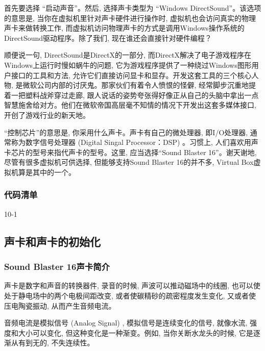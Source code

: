 \documentclass[12pt]{article}
\begin{document}
\begin{CJK}{UTF8}{gbsn}
首先要选择 ``启动声音''。然后, 选择声卡类型为 ``Windows DirectSound''。该选项的意思是, 当你在虚拟机里针对声卡硬件进行操作时, 虚拟机也会访问真实的物理声卡来做转换工作, 而虚拟机访问物理声卡的方式是调用Windows操作系统的DirectSound驱动程序。除了我们, 现在谁还会直接针对硬件编程？

顺便说一句, DirectSound是DirectX的一部分, 而DirectX解决了电子游戏程序在Windows上运行时慢如蜗牛的问题, 它为游戏程序提供了一种绕过Windows图形用户接口的工具和方法, 允许它们直接访问显卡和显存。开发这套工具的三个核心人物, 是微软公司内部的讨厌鬼。那家伙们有着令人愤恨的怪僻, 经常脚步沉重地提着一把塑料战斧穿过走廊, 跟人说话的姿势夸张得好像正从自己的头脑中拿出一点智慧施舍给对方。他们在微软帝国高层毫不知情的情况下开发出这套多媒体接口, 开创了游戏行业的新天地。

“控制芯片”的意思是, 你采用什么声卡。声卡有自己的微处理器, 即I/O处理器, 通常称为数字信号处理器 (Digital Singal Processor：DSP) 。习惯上, 人们喜欢用声卡芯片的型号来指代声卡的型号。这里, 应当选择“Sound Blaster 16”。谢天谢地, 尽管有很多虚拟机可供选择, 但能够支持Sound Blaster 16的并不多, Virtual Box虚拟机算是其中的一个。

\subsubsection{代码清单}
%
%

10-1
%

\subsection{声卡和声卡的初始化}
\subsubsection{Sound Blaster 16声卡简介}
声卡是数字和声音的转换器件, 录音的时候, 声波可以推动磁场中的线圈, 也可以使处于静电场中的两个电极间距改变, 或者使碳精砂的疏密程度发生变化, 又或者使压电陶瓷振动, 从而产生音频电流。

音频电流是模拟信号 (Analog Signal) , 模拟信号是连续变化的信号, 就像水流, 强度和大小可以变化, 但这种变化是一种渐变。例如, 当你关断水龙头的时候, 它是逐渐从有到无的, 不失连续性。


\end{CJK}
\end{document}
